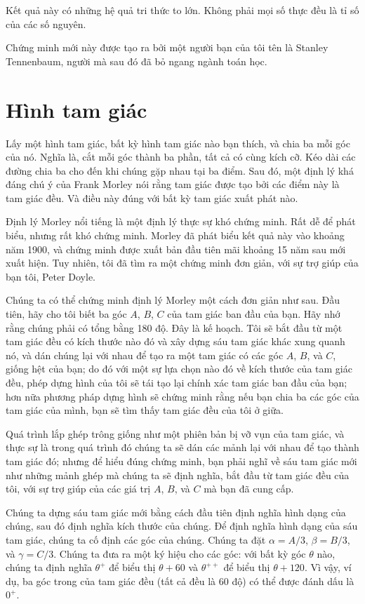 \documentclass[12pt,a4paper]{article}
\begin{document}
Kết quả này có những hệ quả tri thức to lớn. Không phải mọi số thực đều là tỉ số của các số nguyên.

Chứng minh mới này được tạo ra bởi một người bạn của tôi tên là Stanley Tennenbaum, người mà sau đó đã bỏ ngang ngành toán học.

\section*{Hình tam giác}
Lấy một hình tam giác, bất kỳ hình tam giác nào bạn thích, và chia ba mỗi góc của nó. Nghĩa là, cắt mỗi góc thành ba phần, tất cả có cùng kích cỡ.
Kéo dài các đường chia ba cho đến khi chúng gặp nhau tại ba điểm.
Sau đó, một định lý khá đáng chú ý của Frank Morley nói rằng tam giác được tạo bởi các điểm này là tam giác đều.
Và điều này đúng với bất kỳ tam giác xuất phát nào.

Định lý Morley nổi tiếng là một định lý thực sự khó chứng minh. Rất dễ để phát biểu, nhưng rất khó chứng minh. Morley đã phát biểu kết quả này vào khoảng năm 1900, và chứng minh được xuất bản đầu tiên mãi khoảng 15 năm sau mới xuất hiện. Tuy nhiên, tôi đã tìm ra một chứng minh đơn giản, với sự trợ giúp của bạn tôi, Peter Doyle.

Chúng ta có thể chứng minh định lý Morley một cách đơn giản như sau. Đầu tiên, hãy cho tôi biết ba góc $A$, $B$, $C$ của tam giác ban đầu của bạn. Hãy nhớ rằng chúng phải có tổng bằng 180 độ. Đây là kế hoạch. Tôi sẽ bắt đầu từ một tam giác đều có kích thước nào đó và xây dựng sáu tam giác khác xung quanh nó, và dán chúng lại với nhau để tạo ra một tam giác có các góc $A$, $B$, và $C$, giống hệt của bạn; do đó với một sự lựa chọn nào đó về kích thước của tam giác đều, phép dựng hình của tôi sẽ tái tạo lại chính xác tam giác ban đầu của bạn; hơn nữa phương pháp dựng hình sẽ chứng minh rằng nếu bạn chia ba các góc của tam giác của mình, bạn sẽ tìm thấy tam giác đều của tôi ở giữa.

Quá trình lắp ghép trông giống như một phiên bản bị vỡ vụn của tam giác, và thực sự là trong quá trình đó chúng ta sẽ dán các mảnh lại với nhau để tạo thành tam giác đó; nhưng để hiểu đúng chứng minh, bạn phải nghĩ về sáu tam giác mới như những mảnh ghép mà chúng ta sẽ định nghĩa, bắt đầu từ tam giác đều của tôi, với sự trợ giúp của các giá trị $A$, $B$, và $C$ mà bạn đã cung cấp. 

Chúng ta dựng sáu tam giác mới bằng cách đầu tiên định nghĩa hình dạng của chúng, sau đó định nghĩa kích thước của chúng. Để định nghĩa hình dạng của sáu tam giác, chúng ta cố định các góc của chúng. Chúng ta đặt $\alpha = A/3$, $\beta = B/3$, và $\gamma = C/3$. Chúng ta đưa ra một ký hiệu cho các góc: với bất kỳ góc $\theta$ nào, chúng ta định nghĩa $\theta^+$ để biểu thị $\theta + 60$ và $\theta^{++}$ để biểu thị $\theta + 120$. Vì vậy, ví dụ, ba góc trong của tam giác đều (tất cả đều là 60 độ) có thể được đánh dấu là $0^+$.
\end{document}
